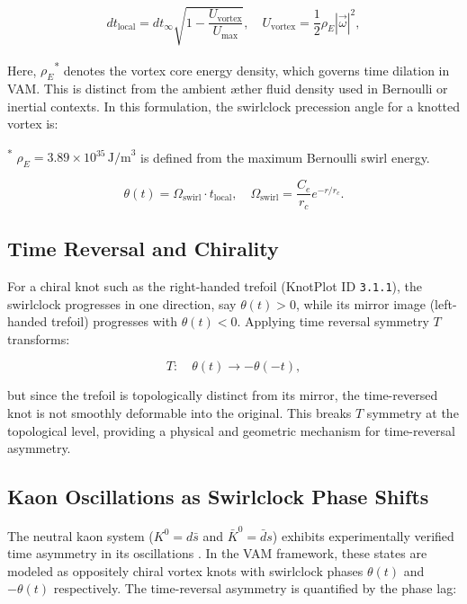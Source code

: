 \documentclass[preprint]{revtex4-2}
\begin{document}
\begin{equation}
dt_{\text{local}} = dt_{\infty} \sqrt{1 - \frac{U_{\text{vortex}}}{U_{\text{max}}}}, \quad U_{\text{vortex}} = \frac{1}{2} \rho_{\scriptscriptstyle\boldsymbol\!E}|\vec{\omega}|^2,
\end{equation}

\noindent
Here, \( \rho_{\scriptscriptstyle\boldsymbol\!E}\)\textsuperscript{*} denotes the vortex core energy density,
which governs time dilation in VAM. This is distinct from the ambient æther fluid density used in Bernoulli or inertial contexts. In this formulation, the swirlclock precession angle for a knotted vortex is:

\vspace{0.5em}
\noindent\textsuperscript{*}\small
\( \rho_{\scriptscriptstyle\boldsymbol\!E}= 3.89 \times 10^{35} \, \text{J/m}^3 \)
is defined from the maximum Bernoulli swirl energy.

\begin{equation}
\theta(t) = \Omega_{\text{swirl}} \cdot t_{\text{local}}, \quad \Omega_{\text{swirl}} = \frac{C_e}{r_c} e^{-r/r_c}.
\end{equation}

\subsection{Time Reversal and Chirality}

For a chiral knot such as the right-handed trefoil (KnotPlot ID \texttt{3.1.1}), the swirlclock progresses in one direction, say $\theta(t) > 0$, while its mirror image (left-handed trefoil) progresses with $\theta(t) < 0$. Applying time reversal symmetry $T$ transforms:

\begin{equation}
T: \quad \theta(t) \rightarrow -\theta(-t),
\end{equation}

but since the trefoil is topologically distinct from its mirror, the time-reversed knot is not smoothly deformable into the original. This breaks $T$ symmetry at the topological level, providing a physical and geometric mechanism for time-reversal asymmetry.

\subsection{Kaon Oscillations as Swirlclock Phase Shifts}

The neutral kaon system ($K^0 = d\bar{s}$ and $\bar{K}^0 = \bar{d}s$) exhibits experimentally verified time asymmetry in its oscillations \cite{christenson1964evidence, cplear1998tviolation}. In the VAM framework, these states are modeled as oppositely chiral vortex knots with swirlclock phases $\theta(t)$ and $-\theta(t)$ respectively. The time-reversal asymmetry is quantified by the phase lag:
\end{document}
